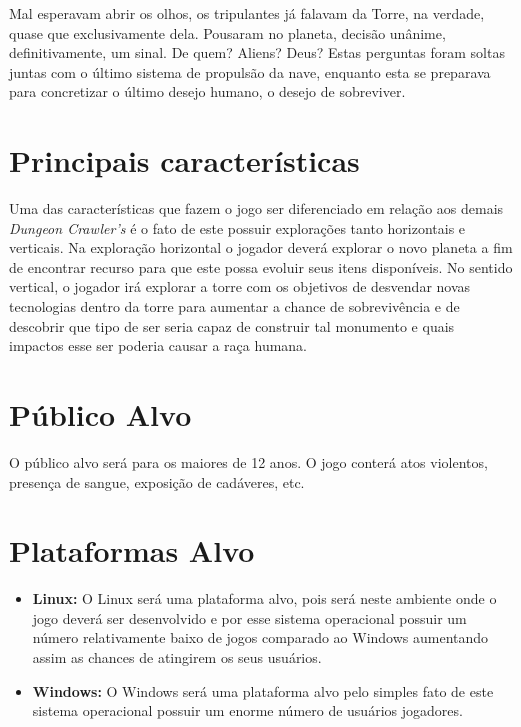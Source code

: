 \documentclass[11pt]{article} %
\begin{document}
Mal esperavam abrir os olhos, os tripulantes já falavam da Torre, na verdade, quase que exclusivamente dela. Pousaram no planeta, decisão unânime, definitivamente, um sinal. De quem? Aliens? Deus? Estas perguntas foram soltas juntas com o último sistema de propulsão da nave, enquanto esta se preparava para concretizar o último desejo humano, o desejo de sobreviver.

\section*{Principais características}

Uma das características que fazem o jogo ser diferenciado em relação aos demais \textit{Dungeon Crawler's} é o fato de este possuir explorações tanto horizontais e verticais. Na exploração horizontal o jogador deverá explorar o novo planeta a fim de encontrar recurso para que este possa evoluir seus itens disponíveis. No sentido vertical, o jogador irá explorar a torre com os objetivos de desvendar novas tecnologias dentro da torre para aumentar a chance de sobrevivência e de descobrir que tipo de ser seria capaz de construir tal monumento e quais impactos esse ser poderia causar a raça humana.

\section*{Público Alvo}

O público alvo será para os maiores de 12 anos. O jogo conterá atos violentos, presença de sangue, exposição de cadáveres, etc.

\section*{Plataformas Alvo}
\begin{itemize}
\item \textbf{Linux:} O Linux será uma plataforma alvo, pois será neste ambiente onde o jogo deverá ser desenvolvido e por esse sistema operacional possuir um número relativamente baixo de jogos comparado ao Windows aumentando assim as chances de atingirem os seus usuários. 

\item \textbf{Windows:} O Windows será uma plataforma alvo pelo simples fato de este sistema operacional possuir um enorme número de usuários jogadores.
\end{itemize}
\end{document}
